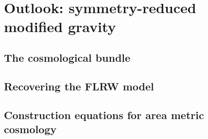\chapter{Outlook: symmetry-reduced modified gravity}

\section{The cosmological bundle}

\section{Recovering the FLRW model}

\section{Construction equations for area metric cosmology}

